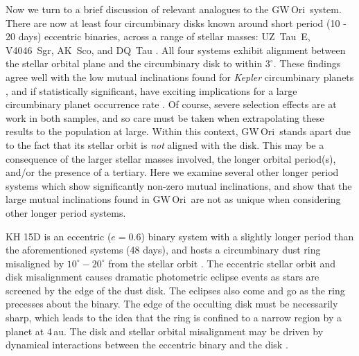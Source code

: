 \documentclass[twocolumn]{aastex61}
\newcommand{\obj}{GW\,Ori}
\begin{document}
Now we turn to a brief discussion of relevant analogues to the \obj\ system. %
There are now at least four circumbinary disks known around short period (10 - 20 days) eccentric binaries, across a range of stellar masses: UZ~Tau~E, V4046~Sgr, AK~Sco, and DQ~Tau \citep{jensen07,rosenfeld12b,czekala15b,czekala16}. All four systems exhibit alignment between the stellar orbital plane and the circumbinary disk to within $3^\circ$. These findings agree well with the low mutual inclinations found for \emph{Kepler} circumbinary planets \citep{winn15}, and if statistically significant, have exciting implications for a large circumbinary planet occurrence rate \citep{li16}. Of course, severe selection effects are at work in both samples, and so care must be taken when extrapolating these results to the population at large. Within this context, \obj\ stands apart due to the fact that its stellar orbit is \emph{not} aligned with the disk. This may be a consequence of the larger stellar masses involved, the longer orbital period(s), and/or the presence of a tertiary. Here we examine several other longer period systems which show significantly non-zero mutual inclinations, and show that the large mutual inclinations found in \obj\ are not as unique when considering other longer period systems.

KH 15D is an eccentric ($e=0.6$) binary system with a slightly longer period than the aforementioned systems (48 days), and hosts a circumbinary dust ring misaligned by $10^\circ - 20^\circ$ from the stellar orbit \citep{chiang04,capelo12}. The eccentric stellar orbit and disk misalignment causes dramatic photometric eclipse events as stars are screened by the edge of the dust disk. The eclipses also come and go as the ring precesses about the binary. The edge of the occulting disk must be necessarily sharp, which leads to the idea that the ring is confined to a narrow region by a planet at 4\,au. The disk and stellar orbital misalignment may be driven by dynamical interactions between the eccentric binary and the disk \citep[e.g.,][]{martin17,zanazzi17}.
\end{document}
